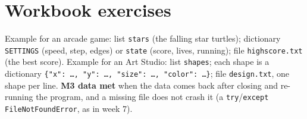 
\section{Workbook exercises}
\begin{answer}
Example for an arcade game: list \texttt{stars} (the falling star turtles); dictionary
\texttt{SETTINGS} (speed, step, edges) or \texttt{state} (score, lives, running); file
\texttt{highscore.txt} (the best score). Example for an Art Studio: list \texttt{shapes}; each shape is
a dictionary \texttt{\{"x": …, "y": …, "size": …, "color": …\}}; file \texttt{design.txt}, one shape
per line. \textbf{M3 data met} when the data comes back after closing and re-running the program, and
a missing file does not crash it (a \texttt{try}/\texttt{except FileNotFoundError}, as in week 7).
\end{answer}

